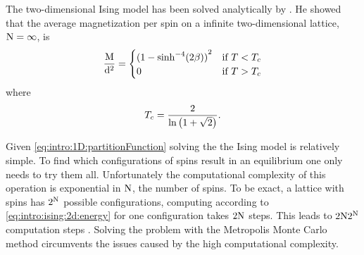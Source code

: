 	The two-dimensional Ising model has been solved analytically by \textcite{onsager1944crystal}. He showed that the average magnetization per spin on a infinite two-dimensional lattice, \ie $\mathrm{N} = \infty$, is
	\begin{equation}
		\label{eq:intro:ising:2D:magnetizationAnalytical}
		\frac{\mathrm{M}}{\mathrm{d}^2} = \begin{cases}
			{(1 - {\sinh}^{-4}(2\beta))}^2 & \text{if } T < T_{c}\\
			0 								& \text{if } T > T_{c}
		\end{cases}
	\end{equation}
	where
	\begin{equation*}
		T_{c} = \frac{2}{\ln \left(1 + \sqrt{2}\right)}.
	\end{equation*}

	Given \cref{eq:intro:1D:partitionFunction} solving the the Ising model is relatively simple. To find which configurations of spins result in an equilibrium one only needs to try them all. Unfortunately the computational complexity of this operation is exponential in $\mathrm{N}$, the number of spins. To be exact, a lattice with \numberOfSpins spins has $2^\mathrm{N}$ possible configurations, computing \energy according to \cref{eq:intro:ising:2d:energy} for one configuration takes $2\mathrm{N}$ steps. This leads to $2\mathrm{N}2^\mathrm{N}$ computation steps \cite{kenzel1997physics}. Solving the problem with the Metropolis Monte Carlo method circumvents the issues caused by the high computational complexity. 